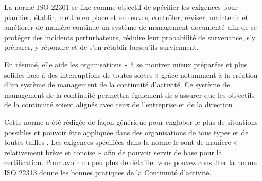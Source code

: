 
 La norme ISO 22301 se fixe comme objectif  de spécifier les exigences pour planifier, établir, mettre en place et en œuvre, contrôler, réviser, maintenir et améliorer de manière continue un système de management documenté afin de se protéger des incidents perturbateurs, réduire leur probabilité de survenance, s'y préparer, y répondre et de s'en rétablir lorsqu'ils surviennent. 

En résumé, elle aide les organisations « à se montrer mieux préparées et plus solides face à des interruptions de toutes sortes »  grâce notamment à la création d’un système de management de la continuité d’activité. Ce système de management de la continuité permettra également de s’assurer que les objectifs de la continuité soient alignés avec ceux de l’entreprise et de la direction .

Cette norme a été rédigée de façon générique pour englober le plus de situations possibles et pouvoir être appliquée dans des organisations de tous types et de toutes tailles . Les exigences spécifiées dans la norme le sont de manière « relativement brève et concise »  afin de pouvoir servir de base pour la certification. Pour avoir un peu plus de détaille, vous pouvez consulter la norme ISO 22313 donne les bonnes pratiques de la Continuité d’activité.


